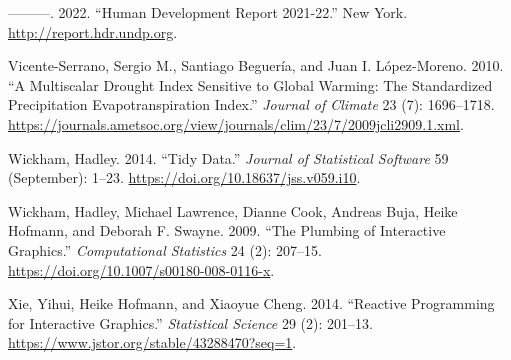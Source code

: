 \documentclass[
]{interact}
\newlength{\cslhangindent}
\newlength{\cslentryspacingunit} %
\newenvironment{CSLReferences}[2] %
 {%
  \setlength{\parindent}{0pt}
  \ifodd #1
  \let\oldpar\par
  \def\par{\hangindent=\cslhangindent\oldpar}
  \fi
  \setlength{\parskip}{#2\cslentryspacingunit}
 }%
 {}
\begin{document}
\begin{CSLReferences}{1}{0}
\leavevmode{}%
---------. 2022. {``Human Development Report 2021-22.''} New York.
\url{http://report.hdr.undp.org}.

\leavevmode{}%
Vicente-Serrano, Sergio M., Santiago Beguería, and Juan I. López-Moreno.
2010. {``A {Multiscalar} {Drought} {Index} {Sensitive} to {Global}
{Warming}: {The} {Standardized} {Precipitation} {Evapotranspiration}
{Index}.''} \emph{Journal of Climate} 23 (7): 1696--1718.
\url{https://journals.ametsoc.org/view/journals/clim/23/7/2009jcli2909.1.xml}.

\leavevmode{}%
Wickham, Hadley. 2014. {``Tidy {Data}.''} \emph{Journal of Statistical
Software} 59 (September): 1--23.
\url{https://doi.org/10.18637/jss.v059.i10}.

\leavevmode{}%
Wickham, Hadley, Michael Lawrence, Dianne Cook, Andreas Buja, Heike
Hofmann, and Deborah F. Swayne. 2009. {``The Plumbing of Interactive
Graphics.''} \emph{Computational Statistics} 24 (2): 207--15.
\url{https://doi.org/10.1007/s00180-008-0116-x}.

\leavevmode{}%
Xie, Yihui, Heike Hofmann, and Xiaoyue Cheng. 2014. {``Reactive
{Programming} for {Interactive} {Graphics}.''} \emph{Statistical
Science} 29 (2): 201--13.
\url{https://www.jstor.org/stable/43288470?seq=1}.

\end{CSLReferences}
\end{document}
